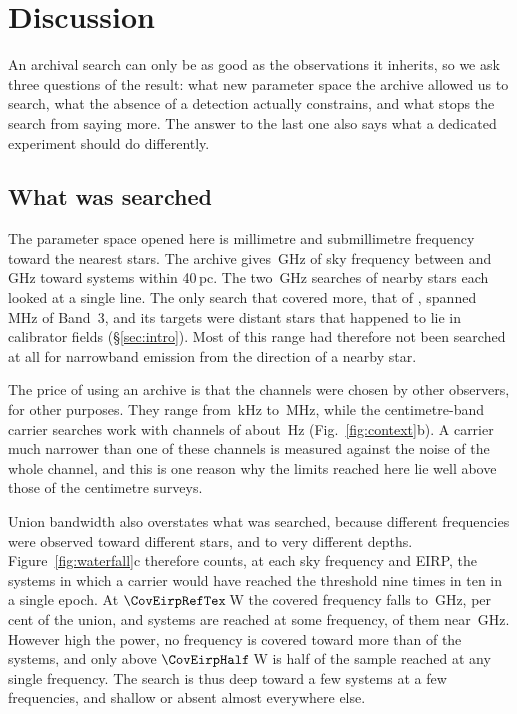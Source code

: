 \section{Discussion}
\label{sec:discussion}

An archival search can only be as good as the observations it inherits, so
we ask three questions of the result: what new parameter space
the archive allowed us to search, what the absence of a detection actually
constrains, and what stops the search from saying more. The answer to the
last one also says what a dedicated experiment should do differently.

\subsection{What was searched}
\label{sec:newspace}

The parameter space opened here is millimetre and submillimetre frequency
toward the nearest stars. The archive gives \CvUnionA\,GHz of sky frequency
between \SurvFreqLoA{} and \SurvFreqHiA\,GHz toward systems within 40\,pc.
The two \SbPriorFreqGHz\,GHz searches of nearby stars each looked at
a single line. The only search that covered more, that of
\citet{Mason2025}, spanned \MasonBandMHz\,MHz of Band~3, and its targets
were distant stars that happened to lie in calibrator fields
(\S\ref{sec:intro}). Most of this range had therefore not been
searched at all for narrowband emission from the direction of a nearby
star.

The price of using an archive is that the channels were chosen by other
observers, for other purposes. They range from \SzChanFinestKHz\,kHz to
\SzChanWidestMHz\,MHz, while the centimetre-band carrier searches work with
channels of about \SzChanLitHz\,Hz (Fig.~\ref{fig:context}b). A carrier much
narrower than one of these channels is measured against the noise of the
whole channel, and this is one reason why the limits reached here lie well
above those of the centimetre surveys.

Union bandwidth also overstates what was searched, because different
frequencies were observed toward different stars, and to very different
depths. Figure~\ref{fig:waterfall}c therefore counts, at each sky frequency
and EIRP, the systems in which a carrier would have reached the threshold
nine times in ten in a single epoch. At $\CovEirpRefTex$\,W the covered frequency falls to
\CovUnionAtRef\,GHz, \CovFracAtRef{} per cent of the union, and
\CovNSysAtRef{} systems are reached at some frequency, \CovNMaxAtRef{} of them
near \CovNuMaxAtRef\,GHz. However high the power, no frequency is covered
toward more than \CovNMaxFull{} of the \NSysClassA{} systems, and only above
$\CovEirpHalf$\,W is half of the sample reached at any single frequency. The search is thus deep toward a few
systems at a few frequencies, and shallow or absent almost everywhere else.

